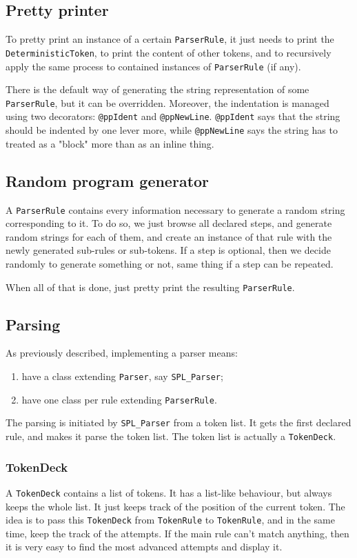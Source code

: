 \documentclass{article}
\newcommand\cc[1]{\lstinline{#1}}
\begin{document}
		\subsection{Pretty printer}
			To pretty print an instance of a certain \cc{ParserRule}, it just needs to print the \cc{DeterministicToken}, to print the content of other tokens, and to recursively apply the same process to contained instances of \cc{ParserRule} (if any).

			There is the default way of generating the string representation of some \cc{ParserRule}, but it can be overridden. Moreover, the indentation is managed using two decorators: \cc{@ppIdent} and \cc{@ppNewLine}. \cc{@ppIdent} says that the string should be indented by one lever more, while \cc{@ppNewLine} says the string has to treated as a "block" more than as an inline thing.
		\subsection{Random program generator}
			A \cc{ParserRule} contains every information necessary to generate a random string corresponding to it. To do so, we just browse all declared steps, and generate random strings for each of them, and create an instance of that rule with the newly generated sub-rules or sub-tokens. If a step is optional, then we decide randomly to generate something or not, same thing if a step can be repeated.

			When all of that is done, just pretty print the resulting \cc{ParserRule}.


		\subsection{Parsing}
			As previously described, implementing a parser means:
			\begin{enumerate}
				\item have a class extending \cc{Parser}, say \cc{SPL_Parser};
				\item have one class per rule extending \cc{ParserRule}.  
			\end{enumerate}
			The parsing is initiated by \cc{SPL_Parser} from a token list. It gets the first declared rule, and makes it parse the token list. The token list is actually a \cc{TokenDeck}.
			\subsubsection{TokenDeck}
				A \cc{TokenDeck} contains a list of tokens. It has a list-like behaviour, but always keeps the whole list. It just keeps track of the position of the current token. The idea is to pass this \cc{TokenDeck} from \cc{TokenRule} to \cc{TokenRule}, and in the same time, keep the track of the attempts.
				If the main rule can't match anything, then it is very easy to find the most advanced attempts and display it.
\end{document}

